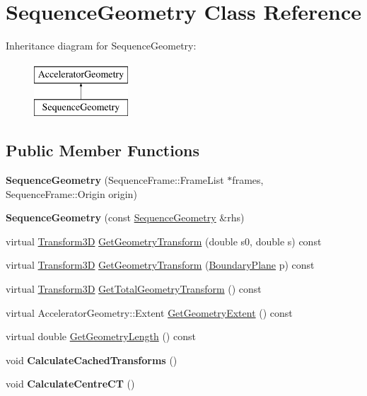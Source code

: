 \hypertarget{classSequenceGeometry}{}\section{Sequence\+Geometry Class Reference}
\label{classSequenceGeometry}
Inheritance diagram for Sequence\+Geometry\+:\begin{figure}[H]
\begin{center}
\leavevmode
\includegraphics[height=2.000000cm]{classSequenceGeometry}
\end{center}
\end{figure}
\subsection*{Public Member Functions}
\begin{DoxyCompactItemize}
\item 
\mbox{\label{classSequenceGeometry_ad8b3d2a91d2b866d14456da2758ffaa9}} 
{\bfseries Sequence\+Geometry} (Sequence\+Frame\+::\+Frame\+List $\ast$frames, Sequence\+Frame\+::\+Origin origin)
\item 
\mbox{\label{classSequenceGeometry_a257f581205514d2291e6d58855e32d20}} 
{\bfseries Sequence\+Geometry} (const \hyperlink{classSequenceGeometry}{Sequence\+Geometry} \&rhs)
\item 
virtual \hyperlink{classTransform3D}{Transform3D} \hyperlink{classSequenceGeometry_a7531d4e915026c4978f12190d6908167}{Get\+Geometry\+Transform} (double s0, double s) const
\item 
virtual \hyperlink{classTransform3D}{Transform3D} \hyperlink{classSequenceGeometry_a4dc3260e63d8fff7b22d7d7908741b1f}{Get\+Geometry\+Transform} (\hyperlink{classAcceleratorGeometry_a5c1661938176102f235836f5a8be6034}{Boundary\+Plane} p) const
\item 
virtual \hyperlink{classTransform3D}{Transform3D} \hyperlink{classSequenceGeometry_a8c7221a5186be9cefe0f7fc674447e71}{Get\+Total\+Geometry\+Transform} () const
\item 
virtual Accelerator\+Geometry\+::\+Extent \hyperlink{classSequenceGeometry_a1d904b73570a03e3496dbbd574b8fde0}{Get\+Geometry\+Extent} () const
\item 
virtual double \hyperlink{classSequenceGeometry_a322e113ebda69e6c42af9415f3c964d9}{Get\+Geometry\+Length} () const
\item 
\mbox{\label{classSequenceGeometry_a8c97eef645ac4e917143dc8780f046cf}} 
void {\bfseries Calculate\+Cached\+Transforms} ()
\item 
\mbox{\label{classSequenceGeometry_a8db35b97e3693eab5670de48b8699965}} 
void {\bfseries Calculate\+Centre\+CT} ()
\end{DoxyCompactItemize}
